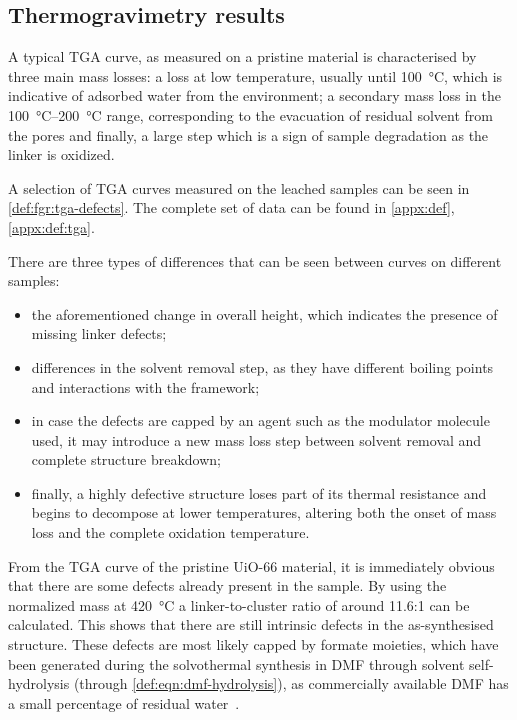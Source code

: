 
\subsection{Thermogravimetry results}

A typical TGA curve, as measured on a pristine material
is characterised by three main mass losses: a loss
at low temperature, usually until \SI{100}{\degreeCelsius},
which is indicative of adsorbed water from the environment;
a secondary mass loss in the \SIrange{100}{200}{\degreeCelsius}
range, corresponding to the evacuation of residual solvent 
from the pores and finally, a large step which is a sign of 
sample degradation as the linker is oxidized.

A selection of TGA curves measured on the leached samples
can be seen in \autoref{def:fgr:tga-defects}. The complete set of data
can be found in \autoref{appx:def}, \autoref{appx:def:tga}.

There are three types of differences that can be seen 
between curves on different samples:

\begin{itemize}
    \item the aforementioned change in overall height,
    which indicates the presence of missing linker defects;
    \item differences in the solvent removal step, as they
    have different boiling points and interactions with the 
    framework;
    \item in case the defects are capped by an agent such as 
    the modulator molecule used, it may introduce a new 
    mass loss step between solvent removal and complete
    structure breakdown;
    \item finally, a highly defective structure loses part 
    of its thermal resistance and begins to decompose 
    at lower temperatures, altering both the onset of mass
    loss and the complete oxidation temperature.
\end{itemize}

From the TGA curve of the pristine UiO-66 material, 
it is immediately obvious that there are some defects 
already present in the sample. By using the normalized
mass at \SI{420}{\degreeCelsius} a linker-to-cluster 
ratio of around 11.6:1 can be calculated. This shows that
there are still intrinsic defects in the as-synthesised 
structure. These defects are most likely capped by 
formate moieties, which have been generated during 
the solvothermal synthesis in DMF through solvent 
self-hydrolysis (through \autoref{def:eqn:dmf-hydrolysis}), as 
commercially available DMF has a small percentage of 
residual water~\cite{shearerDefectEngineeringTuning2016}.

